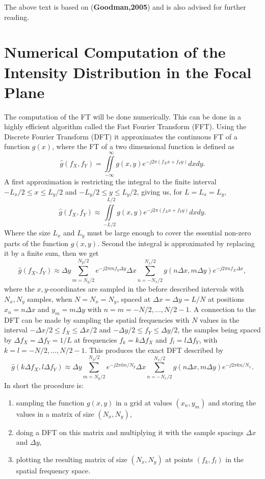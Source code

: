 \documentclass{article}
\begin{document}
The above text is based on (\textbf{Goodman,2005}) and is also advised for further reading.

\section{Numerical Computation of the Intensity Distribution in the Focal Plane}
The computation of the FT will be done numerically. This can be done in a highly efficient algorithm called the Fast Fourier Transform (FFT). Using the Discrete Fourier Transform (DFT) it approximates the continuous FT of a function $g(x)$, where the FT of a two dimensional function is defined as
\begin{equation}
\hat{g}(f_X,f_Y)=\iint\limits_{-\infty}^{~~~\infty} g(x,y)e^{-j2\pi(f_Xx + f_Yy)}dxdy.
\end{equation}
A first approximation is restricting the integral to the finite interval $-L_x/2 \leq x \leq L_y/2$ and $-L_y/2 \leq y \leq L_y/2$, giving us, for $L=L_x=L_y$,
\begin{equation}
\hat{g}(f_X,f_Y)\approx\iint\limits_{-L/2}^{~~~L/2} g(x,y)e^{-j2\pi(f_Xx + f_Yy)}dxdy.
\end{equation}
Where the size $L_x$ and $L_y$ must be large enough to cover the essential non-zero parts of the function $g(x,y)$. Second the integral is approximated by replacing it by a finite sum, then we get
\begin{equation}
\hat{g}(f_X,f_Y)\approx  \Delta y \sum\limits_{m=N_y/2}^{N_y/2} e^{-j2\pi mf_Y\Delta y}\Delta x\sum\limits_{n=-N_x/2}^{N_x/2}g(n\Delta x,m\Delta y)e^{-j2\pi nf_X\Delta x },
\end{equation}
where the $x,y$-coordinates are sampled in the before described intervals with $N_x,N_y$ samples, when $N=N_x=N_y$, spaced at $\Delta x=\Delta y = L/N$ at positions $x_n=n\Delta x$ and $y_m=m\Delta y$ with $n=m=-N/2,...,N/2-1$. A connection to the DFT can be made by sampling the spatial frequencies with $N$ values in the interval $-\Delta x/2 \leq f_X \leq \Delta x/2$ and $-\Delta y/2 \leq f_Y \leq \Delta y/2$, the samples being spaced by $\Delta f_X=\Delta f_Y=1/L$ at frequencies $f_k=k\Delta f_X$ and $f_l=l\Delta f_Y$, with $k=l=-N/2,...,N/2-1$. This produces the exact DFT described by
\begin{equation}
\hat{g}(k\Delta f_X,l\Delta f_Y)\approx  \Delta y \sum\limits_{m=N_y/2}^{N_y/2} e^{-j2\pi lm/N_y}\Delta x\sum\limits_{n=-N_x/2}^{N_x/2}g(n\Delta x,m\Delta y)e^{-j2\pi kn/N_x}.
\end{equation}
In short the procedure is:
\begin{enumerate}
	\item sampling the function $g(x,y)$ in a grid at values $(x_n,y_m)$ and storing the values in a matrix of size $(N_x,N_y)$,
	\item doing a DFT on this matrix and multiplying it with the sample spacings $\Delta x$ and $\Delta y$,
	\item plotting the resulting matrix of size $(N_x,N_y)$ at points $(f_k,f_l)$ in the spatial frequency space.
\end{enumerate}
\end{document}
